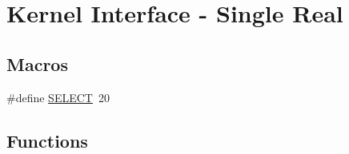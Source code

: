 \hypertarget{group__CORE__float}{}\section{Kernel Interface -\/ Single Real}
\label{group__CORE__float}
\subsection*{Macros}
\begin{DoxyCompactItemize}
\item 
\#define \hyperlink{group__CORE__float_ga53dc4af00adc7b3b4d12eafb71596dfc_ga53dc4af00adc7b3b4d12eafb71596dfc}{S\+E\+L\+E\+C\+T}~20
\end{DoxyCompactItemize}
\subsection*{Functions}
